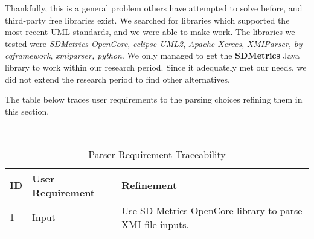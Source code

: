 \documentclass[11pt]{article}
\begin{document}
    Thankfully, this is a general problem others have attempted to solve before, and third-party free libraries exist.
    We searched for libraries which supported the most recent UML standards, and we were able to make work.
    The libraries we tested were \textit{SDMetrics OpenCore},
    \textit{eclipse UML2}, \textit{Apache Xerces}, \textit{XMIParser, by cqframework}, \textit{xmiparser, python}.
    We only managed to get the \textbf{SDMetrics} Java library to work within our research period.
    Since it adequately met our needs, we did not extend the research period to find other alternatives.

    The table below traces user requirements to the parsing choices refining them in this section.
    \begin{table}[htbp]
        \centering
        \caption{Parser Requirement Traceability}\label{tab:parse-choice-table}\\
        \begin{tabularx}{\textwidth}{| l | l | X |}
            \hline
            \textbf{ID} & \textbf{User Requirement} & \textbf{Refinement} \\
            \hline
            1 & Input & Use SD Metrics OpenCore library to parse XMI file inputs. \\ \hline
        \end{tabularx}
    \end{table}
\end{document}
